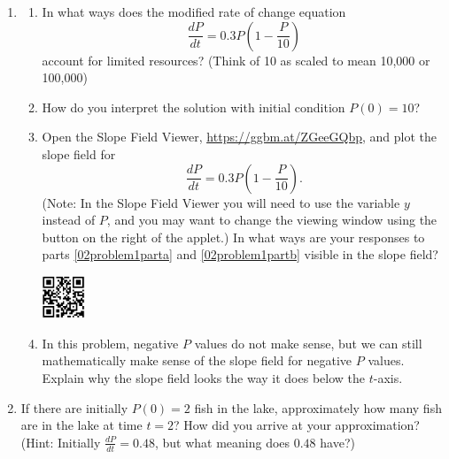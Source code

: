 \begin{enumerate}
\item	\label{02problem1}
\begin{enumerate}
\item In what ways does the modified rate of change equation \label{02problem1parta}
\[ \frac{dP}{dt}=0.3P\left(1-\frac{P}{10}\right) \] account for limited resources? (Think of 10 as scaled to mean 10,000 or 100,000) 
\vfill
\item	How do you interpret the solution with initial condition $P(0) = 10$? \label{02problem1partb}
\vfill
\item	Open the Slope Field Viewer, \href{https://ggbm.at/ZGeeGQbp}{\underline{https://ggbm.at/ZGeeGQbp}},
and plot the slope field for \[ \frac{dP}{dt}=0.3P\left(1-\frac{P}{10}\right). \]
(Note: In the Slope Field Viewer you will need to use the variable $y$ instead of $P$, and you may want to change the viewing window using the button on the right of the applet.) In what ways are your responses to parts \ref{02problem1parta} and \ref{02problem1partb} visible in the slope field? \label{02problem1partc}

\vspace{-1in}\hspace{-0.75in}\includegraphics[width=0.5in]{02/02SlopeFieldViewerQR.png}
\vfill

\item	In this problem, negative $P$ values do not make sense, but we can still mathematically make sense of the slope field for negative $P$ values. Explain why the slope field looks the way it does below the $t$-axis. \label{02problem1partd}
\vfill
\end{enumerate}

\item If there are initially $P(0)=2$ fish in the lake, approximately how many fish are in the lake at time $t=2$?  How did you arrive at your approximation? (Hint: Initially $\frac{dP}{dt} = 0.48$, but what meaning does $0.48$ have?) \label{02problem2}
\vfill
\end{enumerate}

\clearpage

